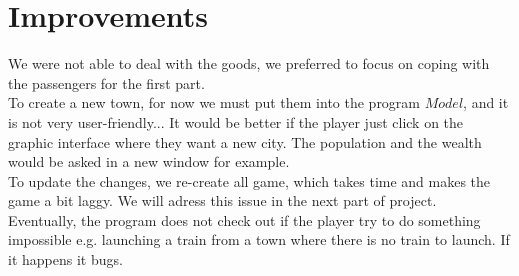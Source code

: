 \documentclass[a4paper]{article}
\begin{document}
	\section{Improvements}
	We were not able to deal with the goods, we preferred to focus on coping with the passengers for the first part.\\
	To create a new town, for now we must put them into the program $Model$, and it is not very user-friendly... It would be better if the player just click on the graphic interface where they want a new city. The population and the wealth would be asked in a new window for example.\\
	To update the changes, we re-create all game, which takes time and makes the game a bit laggy. We will adress this issue in the next part of project.\\
	Eventually, the program does not check out if the player try to do something impossible e.g. launching a train from a town where there is no train to launch. If it happens it bugs.
\end{document}

